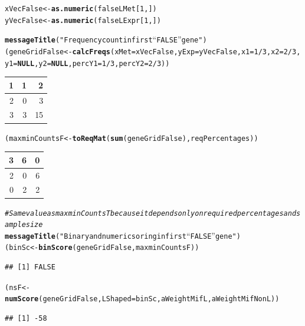 \documentclass[a4paper,10pt]{article}\usepackage[]{graphicx}\usepackage[]{xcolor}
\makeatletter
\newcommand{\hlnum}[1]{\textcolor[rgb]{0.686,0.059,0.569}{#1}}%
\newcommand{\hlstr}[1]{\textcolor[rgb]{0.192,0.494,0.8}{#1}}%
\newcommand{\hlcom}[1]{\textcolor[rgb]{0.678,0.584,0.686}{\textit{#1}}}%
\newcommand{\hlopt}[1]{\textcolor[rgb]{0,0,0}{#1}}%
\newcommand{\hlstd}[1]{\textcolor[rgb]{0.345,0.345,0.345}{#1}}%
\newcommand{\hlkwa}[1]{\textcolor[rgb]{0.161,0.373,0.58}{\textbf{#1}}}%
\newcommand{\hlkwb}[1]{\textcolor[rgb]{0.69,0.353,0.396}{#1}}%
\newcommand{\hlkwc}[1]{\textcolor[rgb]{0.333,0.667,0.333}{#1}}%
\newcommand{\hlkwd}[1]{\textcolor[rgb]{0.737,0.353,0.396}{\textbf{#1}}}%
\newenvironment{kframe}{%
 \def\at@end@of@kframe{}%
 \ifinner\ifhmode%
  \def\at@end@of@kframe{\end{minipage}}%
  \begin{minipage}{\columnwidth}%
 \fi\fi%
 \def\FrameCommand##1{\hskip\@totalleftmargin \hskip-\fboxsep
 \colorbox{shadecolor}{##1}\hskip-\fboxsep
     \hskip-\linewidth \hskip-\@totalleftmargin \hskip\columnwidth}%
 \MakeFramed {\advance\hsize-\width
   \@totalleftmargin\z@ \linewidth\hsize
   \@setminipage}}%
 {\par\unskip\endMakeFramed%
 \at@end@of@kframe}
\newenvironment{knitrout}{}{} %
\makeatother
\begin{document}
\begin{knitrout}
\color{fgcolor}\begin{kframe}
\begin{alltt}
\hlstd{xVecFalse}\hlkwb{<-} \hlkwd{as.numeric}\hlstd{(falseLMet[}\hlnum{1}\hlstd{,])}
\hlstd{yVecFalse}\hlkwb{<-} \hlkwd{as.numeric}\hlstd{(falseLExpr[}\hlnum{1}\hlstd{,])}

\hlkwd{messageTitle}\hlstd{(}\hlstr{"Frequency count in first ``FALSE'' gene"}\hlstd{)}
\hlstd{(geneGridFalse} \hlkwb{<-} \hlkwd{calcFreqs}\hlstd{(}\hlkwc{xMet}\hlstd{=xVecFalse,} \hlkwc{yExp}\hlstd{=yVecFalse,} \hlkwc{x1}\hlstd{=}\hlnum{1}\hlopt{/}\hlnum{3}\hlstd{,} \hlkwc{x2}\hlstd{=}\hlnum{2}\hlopt{/}\hlnum{3}\hlstd{,}
                          \hlkwc{y1}\hlstd{=}\hlkwa{NULL}\hlstd{,} \hlkwc{y2}\hlstd{=}\hlkwa{NULL}\hlstd{,} \hlkwc{percY1}\hlstd{=}\hlnum{1}\hlopt{/}\hlnum{3}\hlstd{,} \hlkwc{percY2}\hlstd{=}\hlnum{2}\hlopt{/}\hlnum{3}\hlstd{))}
\end{alltt}
\end{kframe}


\begin{tabular}{r|r|r}
\hline
1 & 1 & 2\\
\hline
2 & 0 & 3\\
\hline
3 & 3 & 15\\
\hline
\end{tabular}\begin{kframe}\begin{alltt}
\hlstd{(maxminCountsF} \hlkwb{<-} \hlkwd{toReqMat} \hlstd{(}\hlkwd{sum}\hlstd{(geneGridFalse), reqPercentages))}
\end{alltt}
\end{kframe}


\begin{tabular}{r|r|r}
\hline
3 & 6 & 0\\
\hline
2 & 0 & 6\\
\hline
0 & 2 & 2\\
\hline
\end{tabular}\begin{kframe}\begin{alltt}
\hlcom{# Same value as maxminCountsT because it depends only on required percentages and sample size}
\hlkwd{messageTitle}\hlstd{(}\hlstr{"Binary and numeric soring in first ``FALSE'' gene"}\hlstd{)}
\hlstd{(binSc}\hlkwb{<-}\hlkwd{binScore} \hlstd{(geneGridFalse, maxminCountsF))}
\end{alltt}
\begin{verbatim}
## [1] FALSE
\end{verbatim}
\begin{alltt}
\hlstd{(nsF}\hlkwb{<-} \hlkwd{numScore}\hlstd{(geneGridFalse,} \hlkwc{LShaped} \hlstd{= binSc, aWeightMifL, aWeightMifNonL))}
\end{alltt}
\begin{verbatim}
## [1] -58
\end{verbatim}
\end{kframe}
\end{knitrout}
\end{document}
